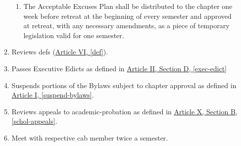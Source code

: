 \begin{enumerate}
\begin{enumerate}
\begin{enumerate}
					 \item The Acceptable Excuses Plan shall be distributed to the chapter one
					week before retreat at the beginning of every semester and approved at
					retreat, with any necessary amendments, as a piece of temporary
					legislation valid for one semester.
				\end{enumerate}	
				\item Reviews \glspl{def} (\hyperref[def]{Article VI, \autoref*{def}}). 
				\item Passes Executive Edicts as defined in \hyperref[exec-edict]{Article II, Section D, \autoref*{exec-edict}}
				\item Suspends portions of the Bylaws subject to chapter approval as defined in \hyperref[suspend-bylaws]{Article I, \autoref*{suspend-bylaws}}.
				\item Reviews appeals to \gls{academic-probation} as defined in \hyperref[schol-appeals]{Article X, Section B, \autoref*{schol-appeals}}.
				\item Meet with respective \gls{cab} member twice a semester.
			\end{enumerate}


\end{enumerate}
